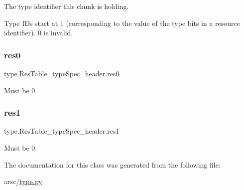 The type identifier this chunk is holding. 

Type I\+Ds start at 1 (corresponding to the value of the type bits in a resource identifier). 0 is invalid. \mbox{\label{classtype_1_1ResTable__typeSpec__header_a3e65b1cd226cc73ec5d8f06bf3436834}} 
\subsubsection{\texorpdfstring{res0}{res0}}
{\footnotesize\ttfamily type.\+Res\+Table\+\_\+type\+Spec\+\_\+header.\+res0}



Must be 0. 

\mbox{\label{classtype_1_1ResTable__typeSpec__header_a7242e42ab27ef430881ca79ac8dac663}} 
\subsubsection{\texorpdfstring{res1}{res1}}
{\footnotesize\ttfamily type.\+Res\+Table\+\_\+type\+Spec\+\_\+header.\+res1}



Must be 0. 



The documentation for this class was generated from the following file\+:\begin{DoxyCompactItemize}
\item 
arsc/\mbox{\hyperlink{type_8py}{type.\+py}}\end{DoxyCompactItemize}
